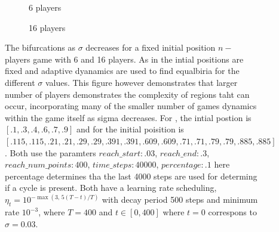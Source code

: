 \documentclass{article}
\begin{document}
                

                \begin{figure}[ht!] 
                    \centering
                    \begin{subfigure}[b]{0.9\linewidth}
                        \centering
                        
                        \caption{6 players} 
                        \label{fig:nplayer_bifurcation:b} 
                        \vspace{4ex}
                    \end{subfigure}%
                    
                    \begin{subfigure}[b]{0.9\linewidth}
                        \centering
                         
                        \caption{16 players } 
                        \label{fig:nplayer_bifurcation:c}
                        \vspace{4ex}
                    \end{subfigure} 
                    \caption{ \small The bifurcations as $\sigma$ decreases for a fixed initial position $n-$players game with 6 and 16 players. As in  the intial positions are fixed and adaptive dyanamics are used to find equalbiria for the different $\sigma$ values. This figure however demonstrates that larger number of players demonstrates the complexity of regions taht can occur, incorporating many of the smaller number of games dynamics within the game itself as sigma decreases.  For , the intial postion is $[.1,.3,.4,.6,.7,.9]$ and for  the initial poisition is $[.115,.115,.21,.21,.29,.29,.391,.391,.609,.609,.71,.71,.79,.79,.885,.885]$. Both  use the paramters $reach\_start:.03$, $reach\_end:.3$, $reach\_num\_points:400$, $time\_steps:40000$, $percentage:.1$ here percentage determines tha the last 4000 steps are used for determing if a cycle is present. Both have a learning rate scheduling, $\eta_t = 10^{-\max(3,\,5(T-t)/T)}$ with decay period 500 steps and minimum rate $10^{-3}$, where $T = 400$ and $t\in[0,400]$ where $t=0$ correspons to $\sigma=0.03$.}
                    \label{fig:nplayer_bifurcation} 
                \end{figure}
                
\end{document}
